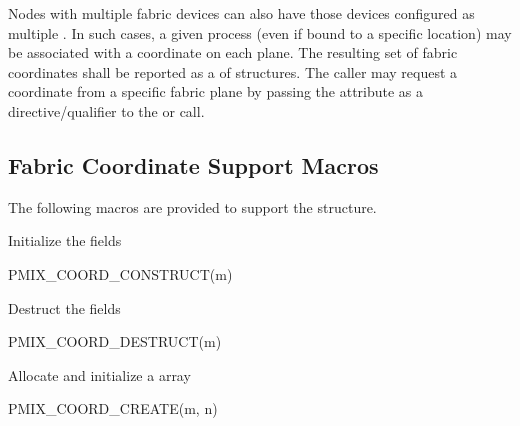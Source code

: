 Nodes with multiple fabric devices can also have those devices configured as multiple . In such cases, a given process (even if bound to a specific location) may be associated with a coordinate on each plane. The resulting set of fabric coordinates shall be reported as a  of  structures. The caller may request a coordinate from a specific fabric plane by passing the  attribute as a directive/qualifier to the  or  call.

\subsection{Fabric Coordinate Support Macros}
\label{api:netcoord:macros}

The following macros are provided to support the  structure.


Initialize the  fields

\cspecificstart
\begin{codepar}
PMIX_COORD_CONSTRUCT(m)
\end{codepar}
\cspecificend

\begin{arglist}
\end{arglist}


Destruct the  fields

\cspecificstart
\begin{codepar}
PMIX_COORD_DESTRUCT(m)
\end{codepar}
\cspecificend

\begin{arglist}
\end{arglist}


Allocate and initialize a  array

\cspecificstart
\begin{codepar}
PMIX_COORD_CREATE(m, n)
\end{codepar}
\cspecificend

